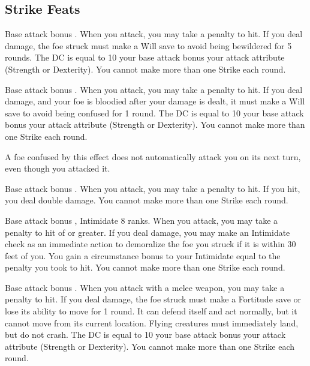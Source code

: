 \subsection{Strike Feats}\label{Strike Feats}

\featpre Base attack bonus .
\featben When you attack, you may take a  penalty to hit. If you deal damage, the foe struck must make a Will save to avoid being bewildered for 5 rounds. The DC is equal to 10 \add your base attack bonus \add your attack attribute (Strength or Dexterity). You cannot make more than one Strike each round.

\featpre Base attack bonus .
\featben When you attack, you may take a  penalty to hit. If you deal damage, and your foe is bloodied after your damage is dealt, it must make a Will save to avoid being confused for 1 round. The DC is equal to 10 \add your base attack bonus \add your attack attribute (Strength or Dexterity). You cannot make more than one Strike each round.

\confusionexplanation A foe confused by this effect does not automatically attack you on its next turn, even though you attacked it.

\featpre Base attack bonus .
\featben When you attack, you may take a  penalty to hit. If you hit, you deal double damage. You cannot make more than one Strike each round.

\featpres Base attack bonus , Intimidate 8 ranks.
\featben When you attack, you may take a penalty to hit of  or greater. If you deal damage, you may make an Intimidate check as an immediate action to demoralize the foe you struck if it is within 30 feet of you. You gain a circumstance bonus to your Intimidate equal to the penalty you took to hit. You cannot make more than one Strike each round.

\featpre Base attack bonus .
\featben When you attack with a melee weapon, you may take a  penalty to hit. If you deal damage, the foe struck must make a Fortitude save or lose its ability to move for 1 round. It can defend itself and act normally, but it cannot move from its current location. Flying creatures must immediately land, but do not crash. The DC is equal to 10 \add your base attack bonus \add your attack attribute (Strength or Dexterity). You cannot make more than one Strike each round.

